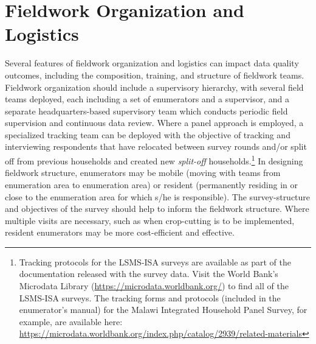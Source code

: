 \documentclass[
]{book}
\begin{document}
\hypertarget{fieldwork-organization-and-logistics}{%
\section{Fieldwork Organization and Logistics}\label{fieldwork-organization-and-logistics}}

Several features of fieldwork organization and logistics can impact data quality outcomes, including the composition, training, and structure of fieldwork teams. Fieldwork organization should include a supervisory hierarchy, with several field teams deployed, each including a set of enumerators and a supervisor, and a separate headquarters-based supervisory team which conducts periodic field supervision and continuous data review. Where a panel approach is employed, a specialized tracking team can be deployed with the objective of tracking and interviewing respondents that have relocated between survey rounds and/or split off from previous households and created new \emph{split-off} households.\footnote{Tracking protocols for the LSMS-ISA surveys are available as part of the documentation released with the survey data. Visit the World Bank's Microdata Library (\url{https://microdata.worldbank.org/}) to find all of the LSMS-ISA surveys. The tracking forms and protocols (included in the enumerator's manual) for the Malawi Integrated Household Panel Survey, for example, are available here: \url{https://microdata.worldbank.org/index.php/catalog/2939/related-materials}} In designing fieldwork structure, enumerators may be mobile (moving with teams from enumeration area to enumeration area) or resident (permanently residing in or close to the enumeration area for which s/he is responsible). The survey-structure and objectives of the survey should help to inform the fieldwork structure. Where multiple visits are necessary, such as when crop-cutting is to be implemented, resident enumerators may be more cost-efficient and effective.
\end{document}
